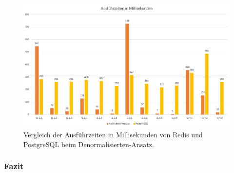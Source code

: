 \begin{figure}[ht]  %
    \centering      %
    \includegraphics[width=1\textwidth]{pictures/results/results-denormalized.png}
    \caption{Vergleich der Ausführzeiten in Millisekunden von Redis und PostgreSQL beim Denormalisierten-Ansatz.}      %
    \label{pic:results-denormalized}    %
\end{figure}

\subsubsection{Fazit}